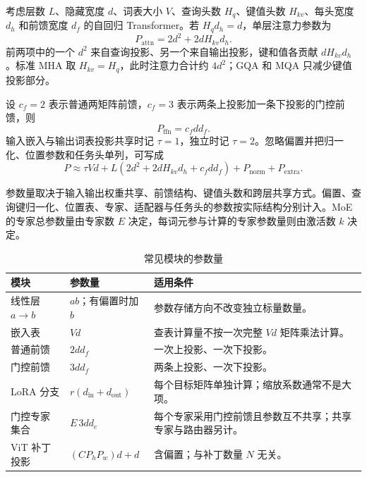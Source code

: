 \documentclass[../textbook.tex]{subfiles}
\begin{document}
考虑层数 $L$、隐藏宽度 $d$、词表大小 $V$、查询头数 $H_q$、键值头数 $H_{kv}$、每头宽度 $d_h$ 和前馈宽度 $d_f$ 的自回归 Transformer。若 $H_qd_h=d$，单层注意力参数为
\begin{equation}
 P_{\mathrm{attn}}=2d^2+2dH_{kv}d_h.
 \label{eq:appendix-attn-params}
\end{equation}
前两项中的一个 $d^2$ 来自查询投影、另一个来自输出投影，键和值各贡献 $dH_{kv}d_h$。标准 MHA 取 $H_{kv}=H_q$，此时注意力合计约 $4d^2$；GQA 和 MQA 只减少键值投影部分。

设 $c_f=2$ 表示普通两矩阵前馈，$c_f=3$ 表示两条上投影加一条下投影的门控前馈，则
\begin{equation}
 P_{\mathrm{ffn}}=c_fdd_f.
\end{equation}
输入嵌入与输出词表投影共享时记 $\tau=1$，独立时记 $\tau=2$。忽略偏置并把归一化、位置参数和任务头单列，可写成
\begin{equation}
 P\approx \tau Vd+L\left(2d^2+2dH_{kv}d_h+c_fdd_f\right)
 +P_{\mathrm{norm}}+P_{\mathrm{extra}}.
 \label{eq:appendix-total-params}
\end{equation}

参数量取决于输入输出权重共享、前馈结构、键值头数和跨层共享方式。偏置、查询键归一化、位置表、专家、适配器与任务头的参数按实际结构分别计入。MoE 的专家总参数量由专家数 $E$ 决定，每词元参与计算的专家参数量则由激活数 $k$ 决定。

\begin{table}[htbp]
\centering
\caption{常见模块的参数量}\label{tab:appendix-parameter-rules}
\begin{tabularx}{\linewidth}{p{.25\linewidth}p{.27\linewidth}X}
\toprule
模块 & 参数量 & 适用条件\\\midrule
线性层 $a\rightarrow b$ & $ab$；有偏置时加 $b$ & 参数存储方向不改变独立标量数量。\\
嵌入表 & $Vd$ & 查表计算量不按一次完整 $Vd$ 矩阵乘法计算。\\
普通前馈 & $2dd_f$ & 一次上投影、一次下投影。\\
门控前馈 & $3dd_f$ & 两条上投影、一次下投影。\\
LoRA 分支 & $r(d_{\mathrm{in}}+d_{\mathrm{out}})$ & 每个目标矩阵单独计算；缩放系数通常不是大项。\\
门控专家集合 & $E\,3dd_e$ & 每个专家采用门控前馈且参数互不共享；共享专家与路由器另计。\\
ViT 补丁投影 & $(CP_hP_w)d+d$ & 含偏置；与补丁数量 $N$ 无关。\\
\bottomrule
\end{tabularx}
\end{table}
\end{document}
